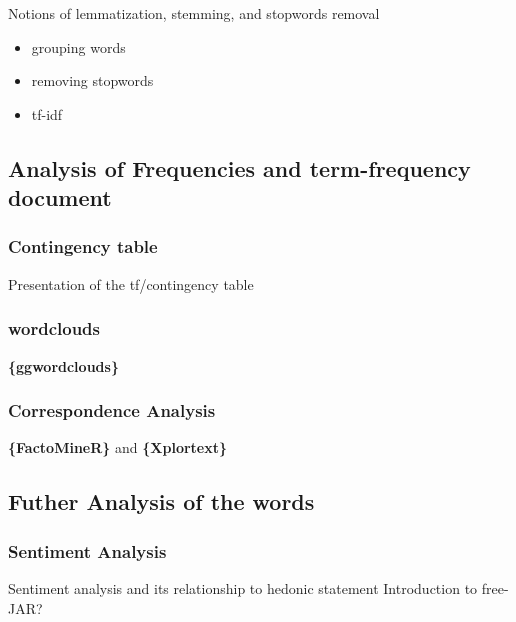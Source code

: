 \documentclass[
]{book}
\providecommand{\tightlist}{%
  \setlength{\itemsep}{0pt}\setlength{\parskip}{0pt}}
\begin{document}
Notions of lemmatization, stemming, and stopwords removal

\begin{itemize}
\tightlist
\item
  grouping words
\item
  removing stopwords
\item
  tf-idf
\end{itemize}

\hypertarget{analysis-of-frequencies-and-term-frequency-document}{%
\subsection{Analysis of Frequencies and term-frequency document}\label{analysis-of-frequencies-and-term-frequency-document}}

\hypertarget{contingency-table}{%
\subsubsection{Contingency table}\label{contingency-table}}

Presentation of the tf/contingency table

\hypertarget{wordclouds}{%
\subsubsection{wordclouds}\label{wordclouds}}

\textbf{\{ggwordclouds\}}

\hypertarget{correspondence-analysis}{%
\subsubsection{Correspondence Analysis}\label{correspondence-analysis}}

\textbf{\{FactoMineR\}} and \textbf{\{Xplortext\}}

\hypertarget{futher-analysis-of-the-words}{%
\subsection{Futher Analysis of the words}\label{futher-analysis-of-the-words}}

\hypertarget{sentiment-analysis-1}{%
\subsubsection{Sentiment Analysis}\label{sentiment-analysis-1}}

Sentiment analysis and its relationship to hedonic statement
Introduction to free-JAR?
\end{document}
